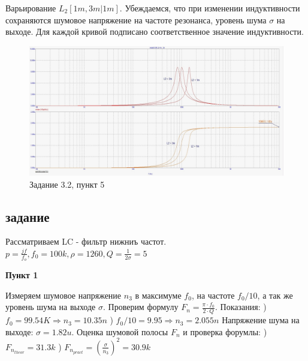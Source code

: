\documentclass[a4paper, 14pt]{extarticle}%
\begin{document}
Варьирование $L_2[1m, 3m | 1m]$.
Убеждаемся, что при изменении индуктивности сохраняются шумовое напряжение на частоте резонанса, уровень шума $\sigma$ на выходе. Для каждой кривой подписано соответственное значение индуктивности.

\begin{figure}[h!]
			\centering
			\includegraphics[width=1.1\linewidth]{3/3_2_4.jpg}
			\caption{Задание 3.2, пункт 5}
			\label{A}
\end{figure}

\subsection{задание}

Рассматриваем LC - фильтр нижниъ частот. 
\newline
$p = \frac{jf}{f_o}, f_0 = 100k, \rho = 1260, Q = \frac{1}{2\sigma} = 5$
\newline


\textbf{Пункт 1}
\newline

Измеряем шумовое напряжение $n_3$ в максимуме $f_0$, на частоте $f_0/10$, а так же уровень шума на выходе $\sigma$.
Проверим формулу $F_n = \frac{\pi\cdot f_0}{2\cdot Q}$.
\newline
Показания:
) $f_0 = 99.54K \Rightarrow n_3 = 10.35n$
) $f_0/10 = 9.95 \Rightarrow n_3 = 2.055n$
\newline
Напряжение шума на выходе:
\newline
$\sigma = 1.82u$.
\newline
Оценка шумовой полосы $F_n$ и проверка форумлы:
) $F_{n_{theor}} = 31.3k$
) $F_{n_{pract}} = (\frac{\sigma}{n_3})^{2} = 30.9k$
\end{document}
